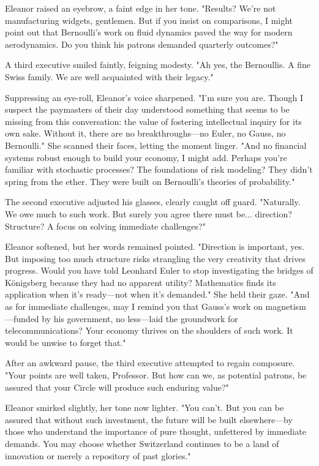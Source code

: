 Eleanor raised an eyebrow, a faint edge in her tone. "Results? We’re not manufacturing widgets, gentlemen. But if you insist on comparisons, I might point out that Bernoulli’s work on fluid dynamics paved the way for modern aerodynamics. Do you think his patrons demanded quarterly outcomes?"
\smallskip

A third executive smiled faintly, feigning modesty. "Ah yes, the Bernoullis. A fine Swiss family. We are well acquainted with their legacy."
\smallskip

Suppressing an eye-roll, Eleanor’s voice sharpened. "I'm sure you are. Though I suspect the paymasters of their day understood something that seems to be missing from this conversation: the value of fostering intellectual inquiry for its own sake. Without it, there are no breakthroughs—no Euler, no Gauss, no Bernoulli." She scanned their faces, letting the moment linger. "And no financial systems robust enough to build your economy, I might add. Perhaps you’re familiar with stochastic processes? The foundations of risk modeling? They didn’t spring from the ether. They were built on Bernoulli’s theories of probability."
\smallskip

The second executive adjusted his glasses, clearly caught off guard. "Naturally. We owe much to such work. But surely you agree there must be... direction? Structure? A focus on solving immediate challenges?"
\smallskip

Eleanor softened, but her words remained pointed. "Direction is important, yes. But imposing too much structure risks strangling the very creativity that drives progress. Would you have told Leonhard Euler to stop investigating the bridges of Königsberg because they had no apparent utility? Mathematics finds its application when it’s ready—not when it’s demanded." She held their gaze. "And as for immediate challenges, may I remind you that Gauss’s work on magnetism—funded by his government, no less—laid the groundwork for telecommunications? Your economy thrives on the shoulders of such work. It would be unwise to forget that."
\smallskip

After an awkward pause, the third executive attempted to regain composure. "Your points are well taken, Professor. But how can we, as potential patrons, be assured that your Circle will produce such enduring value?"
\smallskip

Eleanor smirked slightly, her tone now lighter. "You can’t. But you can be assured that without such investment, the future will be built elsewhere—by those who understand the importance of pure thought, unfettered by immediate demands. You may choose whether Switzerland continues to be a land of innovation or merely a repository of past glories."
\smallskip

